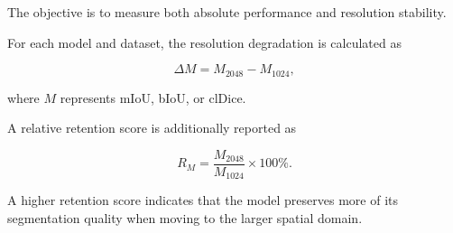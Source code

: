\documentclass[11pt,a4paper]{article}
\begin{document}
The objective is to measure both absolute performance and resolution 
stability.

For each model and dataset, the resolution degradation is calculated as

\begin{equation}
\Delta M
=
M_{2048}
-
M_{1024},
\end{equation}

where $M$ represents mIoU, bIoU, or clDice.

A relative retention score is additionally reported as

\begin{equation}
R_M
=
\frac{M_{2048}}{M_{1024}}
\times 100\%.
\end{equation}

A higher retention score indicates that the model preserves more of its 
segmentation quality when moving to the larger spatial domain.

\begin{table}[t]
\centering
\caption{Quantitative comparison at native $2048\times2048$ resolution. 
Models that cannot execute under the predefined memory budget are reported 
as \texttt{OOM}. Cells with ``--'' indicate pending benchmark evaluations.}
\label{tab:results_2048}
\setlength{\tabcolsep}{5pt}
\renewcommand{\arraystretch}{1.15}
\end{table}
\end{document}
